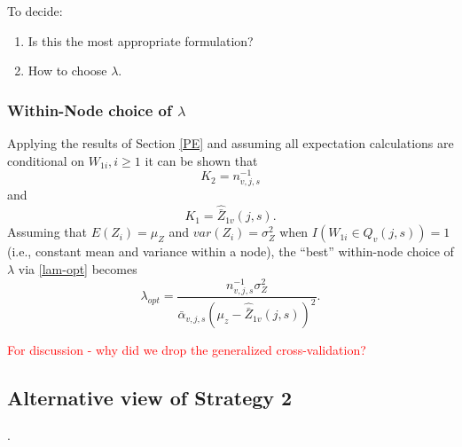 \documentclass[12pt]{article}
\begin{document}
To decide: 
\begin{enumerate}
	\item Is this the most appropriate formulation? 
	\item How to choose $\lambda$.
\end{enumerate}



\subsubsection{Within-Node choice of $\lambda$}
Applying the results of Section \ref{PE} and assuming all expectation
calculations are conditional on $W_{1i}, i \geq 1$ it can be shown that
\[
K_2 = n^{-1}_{v,j,s}
\]
and
\[
K_1 = \hat{\bar{Z}}_{1v}(j,s).
\]
Assuming that $E(Z_i) = \mu_Z$ and $var(Z_i) = \sigma^2_Z$ when $I(
W_{1i} \in Q_{v}(j,s) ) =1$ (i.e., constant mean and variance within a
node), the ``best'' within-node choice of $\lambda$ via
\eqref{lam-opt} becomes
\begin{equation}
\lambda_{opt} = \frac{n^{-1}_{v,j,s} \sigma^2_Z}{ \bar{\alpha}_{v,j,s} (\mu_z -  \hat{\bar{Z}}_{1v}(j,s))^2}.
\end{equation}



\textcolor{red}{For discussion - why did we drop the generalized cross-validation?}







\subsection{Alternative view of Strategy 2}.
\end{document}
